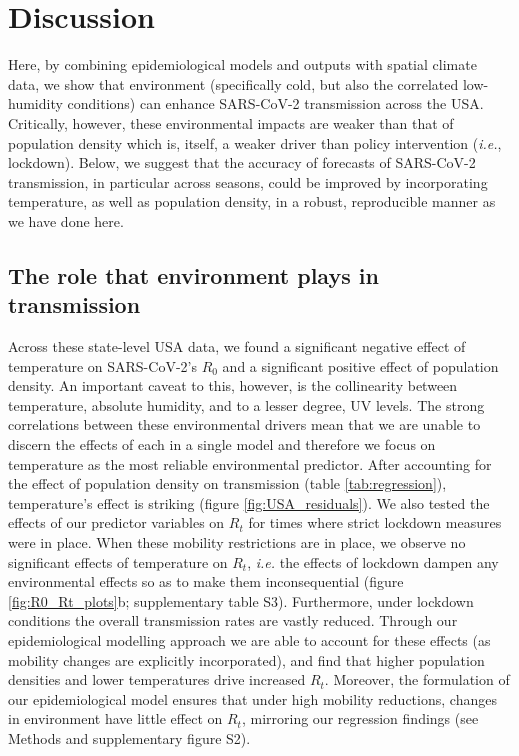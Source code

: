 \documentclass[12pt,english,a4paper]{article}
\newcommand{\virus}{SARS-CoV-2\xspace}
\newcommand{\RO}{$R_0$\xspace}
\begin{document}
\clearpage
\section*{Discussion}

Here, by combining epidemiological models and outputs with spatial climate data, we show that environment (specifically cold, but also the correlated low-humidity conditions)
can enhance \virus transmission across the USA. Critically, however, these environmental impacts are weaker than that of population density which is, itself, a weaker driver than policy intervention (\emph{i.e.}, lockdown). 
Below, we suggest that the accuracy of forecasts of \virus transmission, in particular across seasons, could be improved by incorporating temperature, as well as population density, in a robust, reproducible manner as we have done here.

\subsection*{The role that environment plays in transmission}

Across these state-level USA data, we found a significant negative effect of temperature on \virus's \RO and a significant positive effect of population density. An important caveat to this, however, is the collinearity between temperature, absolute humidity, and to a lesser degree, UV levels. The strong correlations between these environmental drivers mean that we are unable to discern the effects of each in a single model and therefore we focus on temperature as the most reliable environmental predictor. After accounting for the effect of population density on transmission (table \ref{tab:regression}), temperature's effect is  striking (figure \ref{fig:USA_residuals}). 
We also tested the effects of our predictor variables on $R_t$ for times where strict lockdown measures were in place. When these mobility restrictions are in place, we observe no significant effects of temperature on $R_t$, \emph{i.e.} the effects of lockdown dampen any environmental effects so as to make them inconsequential (figure \ref{fig:R0_Rt_plots}b; supplementary table S3). Furthermore, under lockdown conditions the overall transmission rates are vastly reduced. 
Through our epidemiological modelling approach we are able to account for these effects (as mobility changes are explicitly incorporated), and find that higher population densities and lower temperatures drive increased $R_t$. Moreover, the formulation of our epidemiological model ensures that under high mobility reductions, changes in environment have little effect on $R_t$, mirroring our regression findings (see Methods and supplementary figure S2).
\end{document}

